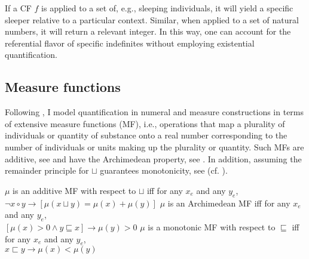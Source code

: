 \documentclass[output=paper,
]{langscibook}
\begin{document}
\noindent If a CF $f$ is applied to a set of, e.g., sleeping individuals, it will yield a specific sleeper relative to a particular context. Similar, when applied to a set of natural numbers, it will return a relevant integer. In this way, one can account for the referential flavor of specific indefinites without employing existential quantification. 

	\subsection{Measure functions}\label{sec:measure-functions}
    
    \largerpage[2]
	Following \cite{krifka1989nominal}, I model quantification in numeral and measure constructions in terms of extensive measure functions (MF), i.e., operations that map a plurality of individuals or quantity of substance onto a real number corresponding to the number of individuals or units making up the plurality or quantity. Such MFs are additive, see  and have the Archimedean property, see . In addition, assuming the remainder principle for $\sqcup$ guarantees monotonicity, see  (cf. \citealt{schwarzschild2002grammar}).

	\ea \ea $\mu$ is an additive MF with respect to $\sqcup$ iff for any $x_e$ and any $y_e$,\\$\neg x \circ y \rightarrow [\mu(x\sqcup y) = \mu(x) + \mu(y)]$\label{ex:mf-additive} 
	\ex $\mu$ is an Archimedean MF iff for any $x_e$ and any $y_e$,\\$[\mu(x) > 0 \wedge y \sqsubseteq x] \rightarrow \mu(y) > 0$\label{ex:mf-archimedean}   
	\ex $\mu$ is a monotonic MF with respect to $\sqsubseteq$ iff for any $x_e$ and any $y_e$,\\$x \sqsubset y \rightarrow \mu(x) < \mu(y)$\label{ex:mf-monotonic}
	\z
    \z

	
\end{document}
